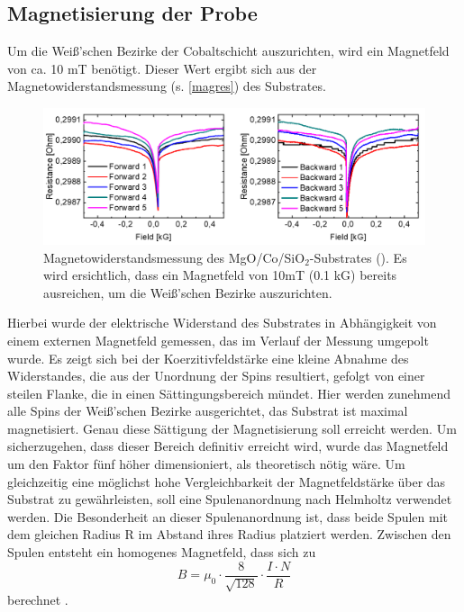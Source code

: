 \subsection{Magnetisierung der Probe}
\label{MagProb}
Um die Weiß'schen Bezirke der Cobaltschicht auszurichten, wird ein Magnetfeld von ca. 10 mT benötigt. Dieser Wert ergibt sich aus der Magnetowiderstandsmessung (s. \autoref{magres}) des Substrates.\begin{figure}[b]
\centering
\includegraphics[width=.85\textwidth]{Bilder/Methodik/magnres}
\caption[Magnetowiderstandsmessung des  MgO/Co/SiO$_\text{2}$-Substrates]{Magnetowiderstandsmessung des  MgO/Co/SiO$_\text{2}$-Substrates (\cite{Mag}). Es wird ersichtlich, dass ein Magnetfeld von 10mT (0.1 kG) bereits ausreichen, um die Weiß'schen Bezirke auszurichten.}
\label{magres}
\end{figure}Hierbei wurde der elektrische Widerstand des Substrates in Abhängigkeit von einem externen Magnetfeld gemessen, das im Verlauf der Messung umgepolt wurde. Es zeigt sich bei der Koerzitivfeldstärke eine kleine Abnahme des Widerstandes, die aus der Unordnung der Spins resultiert, gefolgt von einer steilen Flanke, die in einen Sättingungsbereich mündet. Hier werden zunehmend alle Spins der Weiß'schen Bezirke ausgerichtet, das Substrat ist maximal magnetisiert. Genau diese Sättigung der Magnetisierung soll erreicht werden. Um sicherzugehen, dass dieser Bereich definitiv erreicht wird, wurde das Magnetfeld um den Faktor fünf höher dimensioniert, als theoretisch nötig wäre. Um gleichzeitig eine möglichst hohe Vergleichbarkeit der Magnetfeldstärke über das Substrat zu gewährleisten, soll eine Spulenanordnung nach Helmholtz verwendet werden. Die Besonderheit an dieser Spulenanordnung ist, dass beide Spulen mit dem gleichen Radius R im Abstand ihres Radius platziert werden. Zwischen den Spulen entsteht ein homogenes Magnetfeld, dass sich zu
\begin{equation}
B=\mu_0 \cdot \frac{8}{\sqrt{128}} \cdot \frac{I \cdot N}{R}
\end{equation}
berechnet \cite{Demtroeder.2009}.
\\
